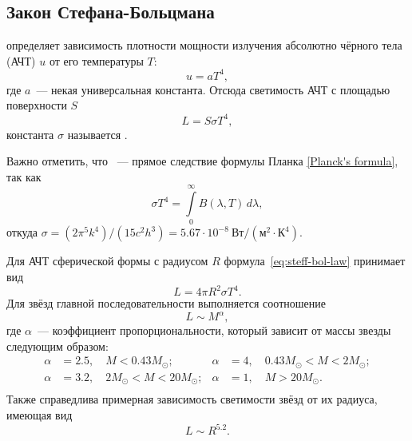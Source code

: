 \subsection{Закон Стефана-Больцмана}
 определяет зависимость плотности мощности излучения абсолютно чёрного тела (АЧТ) $u$ от его температуры $T$:
\begin{equation}
u = a T^4,
\end{equation} 
где $a$~--- некая универсальная константа.
Отсюда светимость АЧТ с площадью поверхности $S$
	\begin{equation}
	L = S \sigma T^4,
	\label{eq:steff-bol-law}
\end{equation}
константа $\sigma$ называется .
  
Важно отметить, что ~--- прямое следствие формулы Планка \eqref{Planck's formula}, так как
\begin{equation}
	\sigma T^4 = \int\limits^\infty_0 B(\lambda, T)\,d\lambda,
\end{equation}
откуда $\sigma = (2\pi^5k^4)/(15c^2h^3) = 5.67 \cdot 10^{-8}~\text{Вт}/(\text{м}^2\cdot \text{К}^4)$.

Для АЧТ сферической формы с радиусом $R$ формула~\eqref{eq:steff-bol-law} принимает вид
\begin{equation}
L=4\pi R^2\sigma T^4.
\end{equation}
Для звёзд главной последовательности выполняется соотношение
\begin{equation}
L\sim M^{\alpha},
\end{equation}
где $\alpha$~--- коэффициент пропорциональности, который зависит от массы звезды следующим образом:
\begin{align*}
\alpha &= 2.5, \quad M < 0.43 M_\odot; & \alpha &= 4, \quad 0.43 M_\odot < M < 2 M_\odot;\\ \alpha &= 3.2, \quad 2 M_\odot < M < 20 M_\odot; & \alpha &= 1, \quad M > 20 M_\odot.\\
\end{align*}
Также справедлива примерная зависимость светимости звёзд от их радиуса, имеющая вид  
\begin{equation}
L\sim R^{5.2}.
\end{equation}
